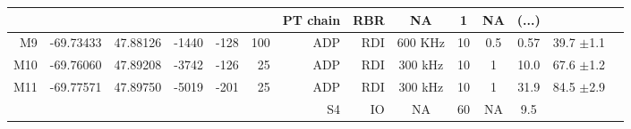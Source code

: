 \documentclass[letterpaper,10pt,landscape]{article}
\begin{document}
\begin{table}
\begin{tabular}{|r|c|c|r|r|r|r|r|c|c|c|c|c|c|}
    ~                   &                            &                           &                        &                      &                     & PT chain     & RBR        & NA        & 1         & NA       & (...)      &                                    \\\hline
    M9                  & -69.73433                  & 47.88126                  & -1440                  & -128                 & 100                 & ADP          & RDI        & 600 KHz   & 10        & 0.5      & 0.57       &  39.7 $\pm$1.1                     \\\hline
    M10                 & -69.76060                  & 47.89208                  & -3742                  & -126                 & 25                  & ADP          & RDI        & 300 kHz   & 10        & 1        & 10.0       &  67.6 $\pm$1.2                     \\\hline
    \multirow{2}{*}{M11}& \multirow{2}{*}{-69.77571} & \multirow{2}{*}{47.89750} & \multirow{2}{*}{-5019} & \multirow{2}{*}{-201}& \multirow{2}{*}{25} & ADP          & RDI        & 300 kHz   & 10        & 1        & 31.9       &  \multirow{2}{*}{84.5 $\pm$2.9}    \\
    ~                   &                            &                           &                        &                      &                     & S4           & IO         & NA        & 60        & NA       & 9.5        &                                    \\\hline
 \end{tabular}


\end{table}
\end{document}

